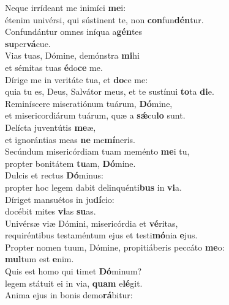\evenverse Neque irrídeant me inimíci \textbf{me}i:~\*\\
\evenverse étenim univérsi, qui sústinent te, non \textbf{con}fun\textbf{dén}tur.\\
\oddverse Confundántur omnes iníqua a\textbf{gén}tes~\*\\
\oddverse \textbf{su}per\textbf{vá}cue.\\
\evenverse Vias tuas, Dómine, demónstra \textbf{mi}hi~\*\\
\evenverse et sémitas tuas \textbf{é}do\textbf{ce} me.\\
\oddverse Dírige me in veritáte tua, et \textbf{do}ce me:~\*\\
\oddverse quia tu es, Deus, Salvátor meus, et te sustínui \textbf{to}ta \textbf{di}e.\\
\evenverse Reminíscere miseratiónum tuárum, \textbf{Dó}mine,~\*\\
\evenverse et misericordiárum tuárum, quæ a \textbf{sǽ}cu\textbf{lo} sunt.\\
\oddverse Delícta juventútis \textbf{me}æ,~\*\\
\oddverse et ignorántias meas \textbf{ne} me\textbf{mí}neris.\\
\evenverse Secúndum misericórdiam tuam meménto \textbf{me}i tu,~\*\\
\evenverse propter bonitátem \textbf{tu}am, \textbf{Dó}mine.\\
\oddverse Dulcis et rectus \textbf{Dó}minus:~\*\\
\oddverse propter hoc legem dabit delinquénti\textbf{bus} in \textbf{vi}a.\\
\evenverse Díriget mansuétos in ju\textbf{dí}cio:~\*\\
\evenverse docébit mites \textbf{vi}as \textbf{su}as.\\
\oddverse Univérsæ viæ Dómini, misericórdia et \textbf{vé}ritas,~\*\\
\oddverse requiréntibus testaméntum ejus et testi\textbf{mó}nia \textbf{e}jus.\\
\evenverse Propter nomen tuum, Dómine, propitiáberis peccáto \textbf{me}o:~\*\\
\evenverse \textbf{mul}tum est \textbf{e}nim.\\
\oddverse Quis est homo qui timet \textbf{Dó}minum?~\*\\
\oddverse legem státuit ei in via, \textbf{quam} e\textbf{lé}git.\\
\evenverse Anima ejus in bonis demo\textbf{rá}bitur:~\*\\
